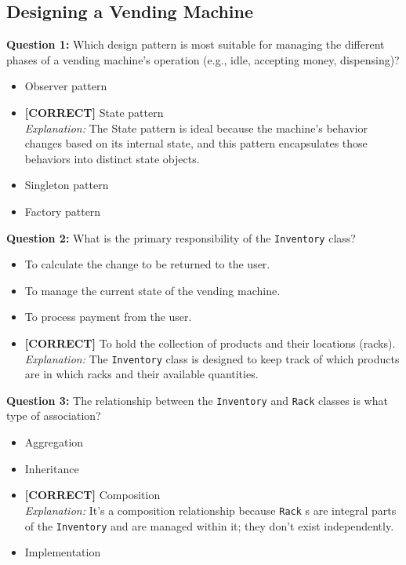 \subsection*{Designing a Vending Machine}
\vspace{0.3cm}
\noindent
\textbf{Question 1:} Which design pattern is most suitable for managing the different phases of a vending machine's operation (e.g., idle, accepting money, dispensing)?
\\[0.2cm]
\begin{itemize}
 \item Observer pattern
 \item \textbf{[CORRECT]} State pattern
\\[0.1cm]
\textit{Explanation:} 
The State pattern is ideal because the machine's behavior changes based on its internal state, and this pattern encapsulates those behaviors into distinct state objects.
 \item Singleton pattern
 \item Factory pattern
\end{itemize}
\vspace{0.3cm}
\noindent
\textbf{Question 2:} What is the primary responsibility of the \texttt{Inventory} class?
\\[0.2cm]
\begin{itemize}
 \item To calculate the change to be returned to the user.
 \item To manage the current state of the vending machine.
 \item To process payment from the user.
 \item \textbf{[CORRECT]} To hold the collection of products and their locations (racks).
\\[0.1cm]
\textit{Explanation:} 
The \texttt{Inventory} class is designed to keep track of which products are in which racks and their available quantities.
\end{itemize}
\vspace{0.3cm}
\noindent
\textbf{Question 3:} The relationship between the \texttt{Inventory} and \texttt{Rack} classes is what type of association?
\\[0.2cm]
\begin{itemize}
 \item Aggregation
 \item Inheritance
 \item \textbf{[CORRECT]} Composition
\\[0.1cm]
\textit{Explanation:} 
It's a composition relationship because \texttt{Rack} s are integral parts of the \texttt{Inventory} and are managed within it; they don't exist independently.
 \item Implementation
\end{itemize}
